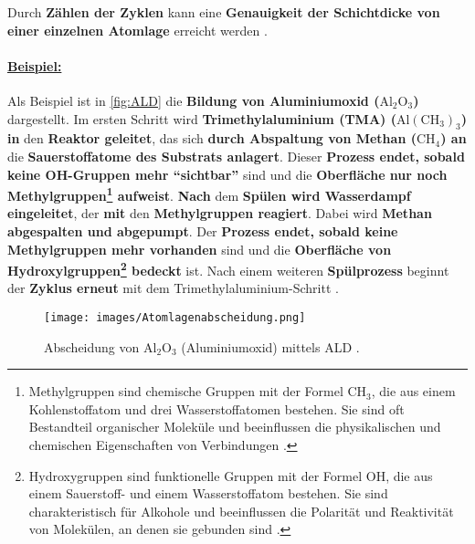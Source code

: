 \documentclass{article} %
\begin{document}
\vspace{1em}

Durch \textbf{Zählen der Zyklen} kann eine \textbf{Genauigkeit der Schichtdicke von einer einzelnen Atomlage} erreicht werden \cite{keplinger2024CVD}.

\paragraph{\uline{Beispiel:}} Als Beispiel ist in \autoref{fig:ALD} die \textbf{Bildung von Aluminiumoxid (\(\mathrm{Al_2O_3}\))} dargestellt. Im ersten Schritt wird \textbf{Trimethylaluminium (TMA) (\(\mathrm{Al(CH_3)_3}\)) in} den \textbf{Reaktor geleitet}, das sich \textbf{durch Abspaltung von Methan ($\mathrm{CH_4}$) an} die \textbf{Sauerstoffatome des Substrats anlagert}. Dieser \textbf{Prozess endet, sobald keine OH-Gruppen mehr ``sichtbar''} sind und die \textbf{Oberfläche nur noch Methylgruppen\footnote{Methylgruppen sind chemische Gruppen mit der Formel \(\mathrm{CH_3}\), die aus einem Kohlenstoffatom und drei Wasserstoffatomen bestehen. Sie sind oft Bestandteil organischer Moleküle und beeinflussen die physikalischen und chemischen Eigenschaften von Verbindungen \cite{petrucci_general_chemistry}.} aufweist}. \textbf{Nach} dem \textbf{Spülen wird Wasserdampf eingeleitet}, der \textbf{mit} den \textbf{Methylgruppen reagiert}. Dabei wird \textbf{Methan abgespalten und abgepumpt}. Der \textbf{Prozess endet, sobald keine Methylgruppen mehr vorhanden} sind und die \textbf{Oberfläche von Hydroxylgruppen\footnote{Hydroxygruppen sind funktionelle Gruppen mit der Formel \(\mathrm{OH}\), die aus einem Sauerstoff- und einem Wasserstoffatom bestehen. Sie sind charakteristisch für Alkohole und beeinflussen die Polarität und Reaktivität von Molekülen, an denen sie gebunden sind \cite{petrucci_general_chemistry}.} bedeckt} ist. Nach einem weiteren \textbf{Spülprozess} beginnt der \textbf{Zyklus erneut} mit dem Trimethylaluminium-Schritt \cite{keplinger2024CVD}.

\begin{figure}[htb!]
    \centering
    \texttt{[image: images/Atomlagenabscheidung.png]} %
    \captionsetup{labelfont=bf} %
    \caption{Abscheidung von \(\mathrm{Al_2O_3}\) (Aluminiumoxid) mittels ALD \cite{keplinger2024CVD}.}
    \label{fig:ALD}
\end{figure}

\vspace{1em}
\end{document}

